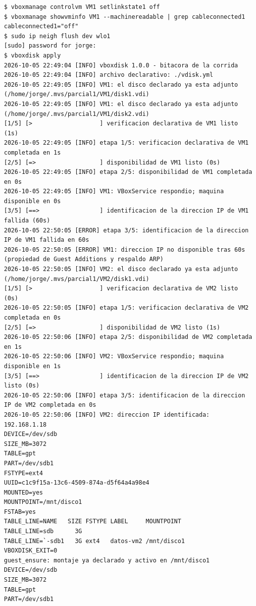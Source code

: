 \begin{lstlisting}[caption={Prueba~6: corrida con \texttt{VM1} sin IP: reintentos agotados y cierre con código~2}, label={lst:prueba6}, basicstyle=\ttfamily\footnotesize, numbers=none, language={}]
$ vboxmanage controlvm VM1 setlinkstate1 off
$ vboxmanage showvminfo VM1 --machinereadable | grep cableconnected1
cableconnected1="off"
$ sudo ip neigh flush dev wlo1
[sudo] password for jorge:
$ vboxdisk apply
2026-10-05 22:49:04 [INFO] vboxdisk 1.0.0 - bitacora de la corrida
2026-10-05 22:49:04 [INFO] archivo declarativo: ./vdisk.yml
2026-10-05 22:49:05 [INFO] VM1: el disco declarado ya esta adjunto (/home/jorge/.mvs/parcial1/VM1/disk1.vdi)
2026-10-05 22:49:05 [INFO] VM1: el disco declarado ya esta adjunto (/home/jorge/.mvs/parcial1/VM1/disk2.vdi)
[1/5] [>                   ] verificacion declarativa de VM1 listo (1s)
2026-10-05 22:49:05 [INFO] etapa 1/5: verificacion declarativa de VM1 completada en 1s
[2/5] [=>                  ] disponibilidad de VM1 listo (0s)
2026-10-05 22:49:05 [INFO] etapa 2/5: disponibilidad de VM1 completada en 0s
2026-10-05 22:49:05 [INFO] VM1: VBoxService respondio; maquina disponible en 0s
[3/5] [==>                 ] identificacion de la direccion IP de VM1 fallida (60s)
2026-10-05 22:50:05 [ERROR] etapa 3/5: identificacion de la direccion IP de VM1 fallida en 60s
2026-10-05 22:50:05 [ERROR] VM1: direccion IP no disponible tras 60s (propiedad de Guest Additions y respaldo ARP)
2026-10-05 22:50:05 [INFO] VM2: el disco declarado ya esta adjunto (/home/jorge/.mvs/parcial1/VM2/disk1.vdi)
[1/5] [>                   ] verificacion declarativa de VM2 listo (0s)
2026-10-05 22:50:05 [INFO] etapa 1/5: verificacion declarativa de VM2 completada en 0s
[2/5] [=>                  ] disponibilidad de VM2 listo (1s)
2026-10-05 22:50:06 [INFO] etapa 2/5: disponibilidad de VM2 completada en 1s
2026-10-05 22:50:06 [INFO] VM2: VBoxService respondio; maquina disponible en 1s
[3/5] [==>                 ] identificacion de la direccion IP de VM2 listo (0s)
2026-10-05 22:50:06 [INFO] etapa 3/5: identificacion de la direccion IP de VM2 completada en 0s
2026-10-05 22:50:06 [INFO] VM2: direccion IP identificada: 192.168.1.18
DEVICE=/dev/sdb
SIZE_MB=3072
TABLE=gpt
PART=/dev/sdb1
FSTYPE=ext4
UUID=c1c9f15a-13c6-4509-874a-d5f64a4a98e4
MOUNTED=yes
MOUNTPOINT=/mnt/disco1
FSTAB=yes
TABLE_LINE=NAME   SIZE FSTYPE LABEL     MOUNTPOINT
TABLE_LINE=sdb      3G
TABLE_LINE=`-sdb1   3G ext4   datos-vm2 /mnt/disco1
VBOXDISK_EXIT=0
guest_ensure: montaje ya declarado y activo en /mnt/disco1
DEVICE=/dev/sdb
SIZE_MB=3072
TABLE=gpt
PART=/dev/sdb1

\end{lstlisting}
